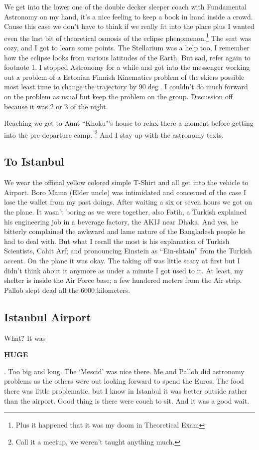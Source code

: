 \documentclass[11pt,a4paper]{article}
\begin{document}
We get into the lower one of the double decker sleeper coach with Fundamental Astronomy on my hand, it's a nice feeling to keep a book in hand inside a crowd. Cause this case we don't have to think if we really fit into the place plus I wanted even the last bit of theoretical osmosis of the eclipse phenomenon.\footnote{Plus it happened that it was my doom in Theoretical Exam} The seat was cozy, and I got to learn some points. The Stellarium was a help too, I remember how the eclipse looks from various latitudes of the Earth. But sad, refer again to footnote 1. I stopped Astronomy for a while and got into the messenger working out a problem of a Estonian Finnish Kinematics problem of the skiers possible most least time to change the trajectory by $90\deg$. I couldn't do much forward on the problem as usual but keep the problem on the group. Discussion off because it was 2 or 3 of the night.

Reaching we get to Aunt ``Khoku"'s house to relax there a moment before getting into the pre-departure camp. \footnote{Call it a meetup, we weren't taught anything much.} And I stay up with the astronomy texts.
\subsection{To Istanbul}
We wear the official yellow colored simple T-Shirt and all get into the vehicle to Airport. Boro Mama (Elder uncle) was intimidated and concerned of the case I lose the wallet from my past doings. After waiting a six or seven hours we got on the plane. It wasn't boring as we were together, also Fatih, a Turkish explained his engineering job in a beverage factory, the  AKIJ near Dhaka. And yes, he bitterly complained the awkward and lame nature of the Bangladesh people he had to deal with. But what I recall the most is his explanation of Turkish Scientists, Cahit Arf; and pronouncing Einstein as ``Ein-shtain'' from the Turkish accent. On the plane it was okay. The taking off was little scary at first but I didn't think about it anymore as under a minute I got used to it. At least,  my shelter is inside the Air Force base; a few hundered meters from the Air strip. Pallob slept dead all the 6000 kilometers.
\subsection{Istanbul Airport}
What? It was \begin{huge}
\textbf{HUGE}
\end{huge}. Too big and long. The `Mescid' was nice there. Me and Pallob did astronomy problems as the others were out looking forward to spend the Euros. The food there was little problematic, but I know in Istanbul it was better outside rather than the airport. Good thing is there were couch to sit. And it was a good wait.
\end{document}
